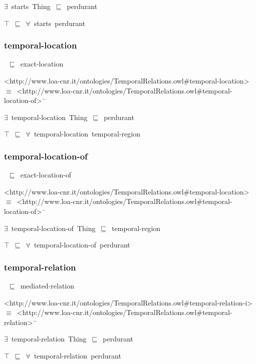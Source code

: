 \documentclass{article}
\begin{document}
\ensuremath{\exists}~starts~Thing~\ensuremath{\sqsubseteq}~perdurant

\ensuremath{\top}~\ensuremath{\sqsubseteq}~\ensuremath{\forall}~starts~perdurant

\subsubsection*{temporal-location}

~\ensuremath{\sqsubseteq}~exact-location

<http://www.loa-cnr.it/ontologies/TemporalRelations.owl#temporal-location>~\ensuremath{\equiv}~<http://www.loa-cnr.it/ontologies/TemporalRelations.owl#temporal-location-of>\ensuremath{^-}

\ensuremath{\exists}~temporal-location~Thing~\ensuremath{\sqsubseteq}~perdurant

\ensuremath{\top}~\ensuremath{\sqsubseteq}~\ensuremath{\forall}~temporal-location~temporal-region

\subsubsection*{temporal-location-of}

~\ensuremath{\sqsubseteq}~exact-location-of

<http://www.loa-cnr.it/ontologies/TemporalRelations.owl#temporal-location>~\ensuremath{\equiv}~<http://www.loa-cnr.it/ontologies/TemporalRelations.owl#temporal-location-of>\ensuremath{^-}

\ensuremath{\exists}~temporal-location-of~Thing~\ensuremath{\sqsubseteq}~temporal-region

\ensuremath{\top}~\ensuremath{\sqsubseteq}~\ensuremath{\forall}~temporal-location-of~perdurant

\subsubsection*{temporal-relation}

~\ensuremath{\sqsubseteq}~mediated-relation

<http://www.loa-cnr.it/ontologies/TemporalRelations.owl#temporal-relation-i>~\ensuremath{\equiv}~<http://www.loa-cnr.it/ontologies/TemporalRelations.owl#temporal-relation>\ensuremath{^-}

\ensuremath{\exists}~temporal-relation~Thing~\ensuremath{\sqsubseteq}~perdurant

\ensuremath{\top}~\ensuremath{\sqsubseteq}~\ensuremath{\forall}~temporal-relation~perdurant
\end{document}
